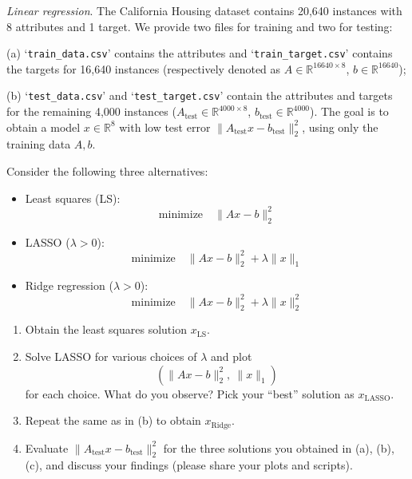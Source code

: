 \documentclass[11pt,letter,notitlepage]{article}
\theoremstyle{definition}
\begin{document}
\newpage
\begin{exercise}
\textit{Linear regression}. The California Housing dataset contains 20,640 instances with 8 attributes and
1 target. We provide two files for training and two for testing:

(a) `\texttt{train\_data.csv}' contains the attributes and `\texttt{train\_target.csv}' contains the targets for
16,640 instances (respectively denoted as $A \in \mathbb{R}^{16640 \times 8}$, $b \in \mathbb{R}^{16640}$);

(b) `\texttt{test\_data.csv}' and `\texttt{test\_target.csv}' contain the attributes and targets for the remaining 4,000 instances ($A_{\text{test}} \in \mathbb{R}^{4000 \times 8}$, $b_{\text{test}} \in \mathbb{R}^{4000}$). The goal is to obtain a model $x \in \mathbb{R}^8$ with low test error $\|A_{\text{test}}x - b_{\text{test}}\|_2^2$, using only the training data $A,b$.

Consider the following three alternatives:
\begin{itemize}
    \item Least squares (LS):
    \[
    \text{minimize} \quad \|Ax - b\|_2^2
    \]

    \item LASSO ($\lambda > 0$):
    \[
    \text{minimize} \quad \|Ax - b\|_2^2 + \lambda \|x\|_1
    \]

    \item Ridge regression ($\lambda > 0$):
    \[
    \text{minimize} \quad \|Ax - b\|_2^2 + \lambda \|x\|_2^2
    \]
\end{itemize}

\begin{enumerate}[label=(\alph*)]
    \item Obtain the least squares solution $x_{\mathrm{LS}}$.
    \item Solve LASSO for various choices of $\lambda$ and plot
    \[
    \left(\|Ax-b\|_2^2,\ \|x\|_1\right)
    \]
    for each choice. What do you observe? Pick your ``best'' solution as $x_{\mathrm{LASSO}}$.
    \item Repeat the same as in (b) to obtain $x_{\mathrm{Ridge}}$.
    \item Evaluate $\|A_{\text{test}}x - b_{\text{test}}\|_2^2$ for the three solutions you obtained in
    (a), (b), (c), and discuss your findings (please share your plots and scripts).
\end{enumerate}
\end{exercise}

\newpage
\end{document}

